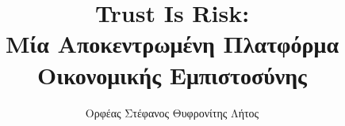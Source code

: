 \setcounter{page}{5}
\title{\textlatin{Trust Is Risk}: \\ Μία Αποκεντρωμένη Πλατφόρμα Οικονομικής Εμπιστοσύνης}
\author{Ορφέας Στέφανος Θυφρονίτης Λήτος}        
\maketitle
